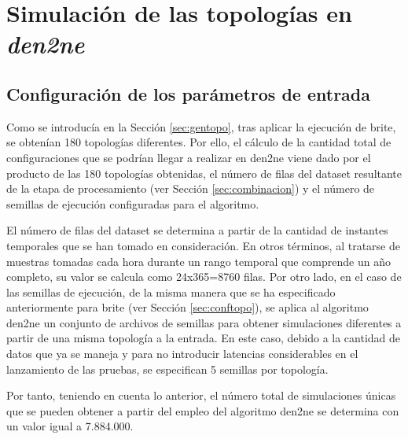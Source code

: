 \section{Simulación de las topologías en \textit{den2ne}}
\label{sec:cambiosden2ne}

\subsection{Configuración de los parámetros de entrada}
\label{sec:confden2ne}

Como se introducía en la Sección \ref{sec:gentopo}, tras aplicar la ejecución de \gls{brite}, se obtenían 180 topologías diferentes. Por ello, el cálculo de la cantidad total de configuraciones que se podrían llegar a realizar en \gls{den2ne} viene dado por el producto de las 180 topologías obtenidas, el número de filas del dataset resultante de la etapa de procesamiento (ver Sección \ref{sec:combinacion}) y el número de semillas de ejecución configuradas para el algoritmo. 

\vspace{3mm}

El número de filas del dataset se determina a partir de la cantidad de instantes temporales que se han tomado en consideración. En otros términos, al tratarse de muestras tomadas cada hora durante un rango temporal que comprende un año completo, su valor se calcula como 24x365=8760 filas. Por otro lado, en el caso de las semillas de ejecución, de la misma manera que se ha especificado anteriormente para \gls{brite} (ver Sección \ref{sec:conftopo}), se aplica al algoritmo \gls{den2ne} un conjunto de archivos de semillas para obtener simulaciones diferentes a partir de una misma topología a la entrada. En este caso, debido a la cantidad de datos que ya se maneja y para no introducir latencias considerables en el lanzamiento de las pruebas, se especifican 5 semillas por topología.

\vspace{3mm}

Por tanto, teniendo en cuenta lo anterior, el número total de simulaciones únicas que se pueden obtener a partir del empleo del algoritmo \gls{den2ne} se determina con un valor igual a 7.884.000.

